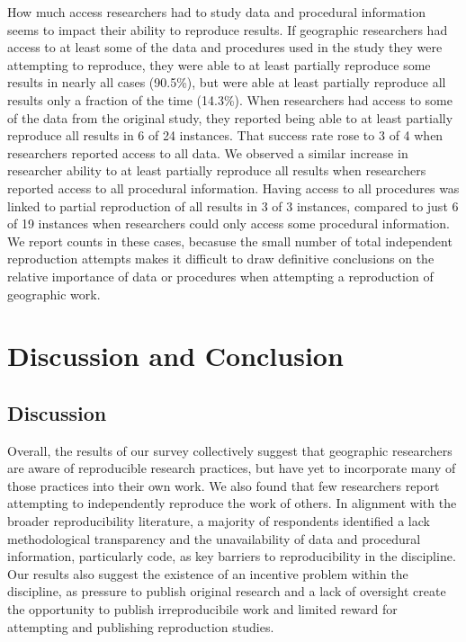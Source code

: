 \documentclass[]{interact}
\theoremstyle{plain}%
\theoremstyle{definition}
\theoremstyle{remark}
\begin{document}
How much access researchers had to study data and procedural information seems to impact their ability to reproduce results. 
If geographic researchers had access to at least some of the data and procedures used in the study they were attempting to reproduce, they were able to at least partially reproduce some results in nearly all cases (90.5\%), but were able at least partially reproduce all results only a fraction of the time (14.3\%).
When researchers had access to some of the data from the original study, they reported being able to at least partially reproduce all results in 6 of 24 instances. 
That success rate rose to 3 of 4 when researchers reported access to all data. 
We observed a similar increase in researcher ability to at least partially reproduce all results when researchers reported access to all procedural information. 
Having access to all procedures was linked to partial reproduction of all results in 3 of 3 instances, compared to just 6 of 19 instances when researchers could only access some procedural information. 
We report counts in these cases, becasuse the small number of total independent reproduction attempts makes it difficult to draw definitive conclusions on the relative importance of data or procedures when attempting a reproduction of geographic work.


\section*{Discussion and Conclusion}

\subsection*{Discussion}
Overall, the results of our survey collectively suggest that geographic researchers are aware of reproducible research practices, but have yet to incorporate many of those practices into their own work. 
We also found that few researchers report attempting to independently reproduce the work of others. 
In alignment with the broader reproducibility literature, a majority of respondents identified a lack methodological transparency and the unavailability of data and procedural information, particularly code, as key barriers to reproducibility in the discipline. 
Our results also suggest the existence of an incentive problem within the discipline, as pressure to publish original research and a lack of oversight create the opportunity to publish irreproducibile work and limited reward for attempting and publishing reproduction studies.  
\end{document}
